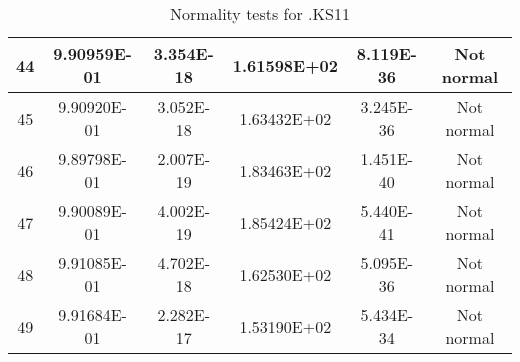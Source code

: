 \begin{table}[h]
\begin{tabular}{|c|c|c|c|c|c|}
		44 & 9.90959E-01 & 3.354E-18 & 1.61598E+02 & 8.119E-36 & Not normal\\\hline
		45 & 9.90920E-01 & 3.052E-18 & 1.63432E+02 & 3.245E-36 & Not normal\\\hline
		46 & 9.89798E-01 & 2.007E-19 & 1.83463E+02 & 1.451E-40 & Not normal\\\hline
		47 & 9.90089E-01 & 4.002E-19 & 1.85424E+02 & 5.440E-41 & Not normal\\\hline
		48 & 9.91085E-01 & 4.702E-18 & 1.62530E+02 & 5.095E-36 & Not normal\\\hline
		49 & 9.91684E-01 & 2.282E-17 & 1.53190E+02 & 5.434E-34 & Not normal\\\hline
	\end{tabular}
	\caption{Normality tests for .KS11}
	\label{tab:normality_tests_KS11}
\end{table}
